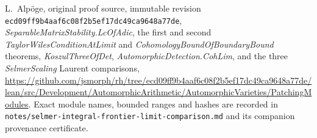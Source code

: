L.~Alp\"oge, original proof source, immutable revision
\texttt{ecd09ff9b4aaf6c08f2b5ef17dc49ca9648a77de},
\emph{SeparableMatrixStability.LcOfAdic}, the first and second
\emph{TaylorWilesConditionAtLimit} and
\emph{CohomologyBoundOfBoundaryBound} theorems,
\emph{KoszulThreeOfDet}, \emph{AutomorphicDetection.CohLim}, and
the three \emph{SelmerScaling} Laurent comparisons,
\url{https://github.com/jsmorph/rh/tree/ecd09ff9b4aaf6c08f2b5ef17dc49ca9648a77de/lean/src/Development/AutomorphicArithmetic/AutomorphicVarieties/PatchingModules}.
Exact module names, bounded ranges and hashes are recorded in
\texttt{notes/selmer-integral-frontier-limit-comparison.md} and its
companion provenance certificate.

